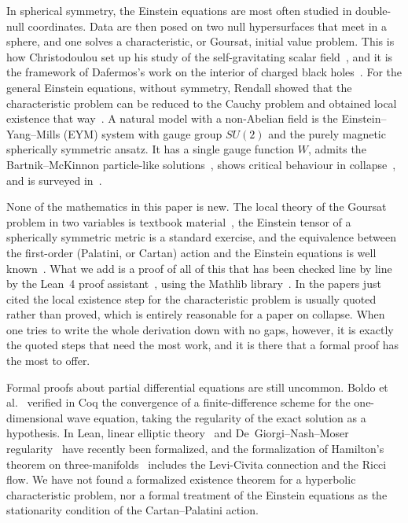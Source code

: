 \documentclass[pdflatex,sn-mathphys-num]{sn-jnl}%
\theoremstyle{thmstyleone}%
\theoremstyle{thmstyletwo}%
\theoremstyle{thmstylethree}%
\begin{document}
In spherical symmetry, the Einstein equations are most often studied in double-null coordinates. Data are then posed on two null hypersurfaces that meet in a sphere, and one solves a characteristic, or Goursat, initial value problem. This is how Christodoulou set up his study of the self-gravitating scalar field~\cite{Christodoulou1986,Christodoulou1993}, and it is the framework of Dafermos's work on the interior of charged black holes~\cite{Dafermos2005}. For the general Einstein equations, without symmetry, Rendall showed that the characteristic problem can be reduced to the Cauchy problem and obtained local existence that way~\cite{Rendall1990}. A natural model with a non-Abelian field is the Einstein--Yang--Mills (EYM) system with gauge group $SU(2)$ and the purely magnetic spherically symmetric ansatz. It has a single gauge function $W$, admits the Bartnik--McKinnon particle-like solutions~\cite{BartnikMcKinnon1988}, shows critical behaviour in collapse~\cite{ChoptuikChmajBizon1996}, and is surveyed in~\cite{VolkovGaltsov1999}.

None of the mathematics in this paper is new. The local theory of the Goursat problem in two variables is textbook material~\cite{Garabedian1964,CourantHilbert1962}, the Einstein tensor of a spherically symmetric metric is a standard exercise, and the equivalence between the first-order (Palatini, or Cartan) action and the Einstein equations is well known~\cite{Peldan1994,Wald1984}. What we add is a proof of all of this that has been checked line by line by the Lean~4 proof assistant~\cite{deMouraUllrich2021}, using the Mathlib library~\cite{mathlib2020}. In the papers just cited the local existence step for the characteristic problem is usually quoted rather than proved, which is entirely reasonable for a paper on collapse. When one tries to write the whole derivation down with no gaps, however, it is exactly the quoted steps that need the most work, and it is there that a formal proof has the most to offer.

Formal proofs about partial differential equations are still uncommon. Boldo et al.~\cite{Boldo2014} verified in Coq the convergence of a finite-difference scheme for the one-dimensional wave equation, taking the regularity of the exact solution as a hypothesis. In Lean, linear elliptic theory~\cite{SotoFrancoMarshallStevens2026} and De~Giorgi--Nash--Moser regularity~\cite{ArmstrongKempe2026} have recently been formalized, and the formalization of Hamilton's theorem on three-manifolds~\cite{ChowLiaoQin2026} includes the Levi-Civita connection and the Ricci flow. We have not found a formalized existence theorem for a hyperbolic characteristic problem, nor a formal treatment of the Einstein equations as the stationarity condition of the Cartan--Palatini action.
\end{document}
